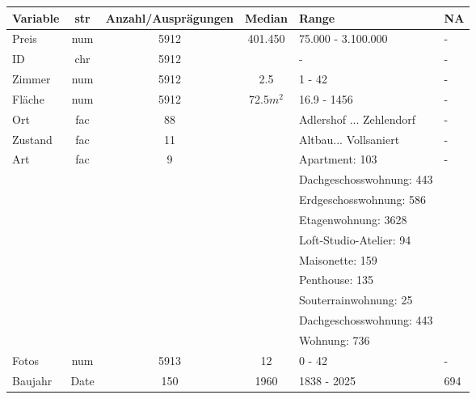 \begin{landscape}
	\begin{tabular}{|l||c|c|c|l|l|} \hline
		Variable         & str  & Anzahl/Ausprägungen & Median	    	& Range                          & NA \\ \hline \hline
		Preis       	 & num  & 5912                & 401.450      	& 75.000 - 3.100.000             & - \\  \hline
		ID               & chr  & 5912                &			    	& -                              & -\\ \hline
		Zimmer           & num  & 5912                & 2.5  	    	& 1 - 42                         & -\\ \hline
		Fläche           & num  & 5912                &	72.5$m^2$    	& 16.9 - 1456                    & -\\ \hline
		Ort      		 & fac	& 88                  &				    & Adlershof ... Zehlendorf       & -  \\ \hline
		Zustand    		 & fac	& 11                  &				    & Altbau... Vollsaniert          & -  \\ \hline
		Art              & fac  & 9                   &    				& Apartment: 103                 & - \\ 
						&      &                     &	    			& Dachgeschosswohnung: 443       & \\
						&      &                     &    				& Erdgeschosswohnung: 586        & \\
						&      &                     &    				& Etagenwohnung: 3628            & \\
						&      &                     &	    			& Loft-Studio-Atelier: 94        & \\
						&      &                     &	    			& Maisonette: 159                & \\
						&      &                     &	    			& Penthouse: 135                 & \\
						&      &                     &	    			& Souterrainwohnung: 25          & \\
						&      &                     &	    			& Dachgeschosswohnung: 443       & \\
						&      &                     &	    			& Wohnung: 736                   & \\ \hline
		Fotos 		    & num  & 5913                &	12	    		& 0 - 42                         & - \\ \hline
		Baujahr         & Date & 150                 & 1960   			& 1838 - 2025                    & 694 \\ \hline

\end{tabular}
\end{landscape}
